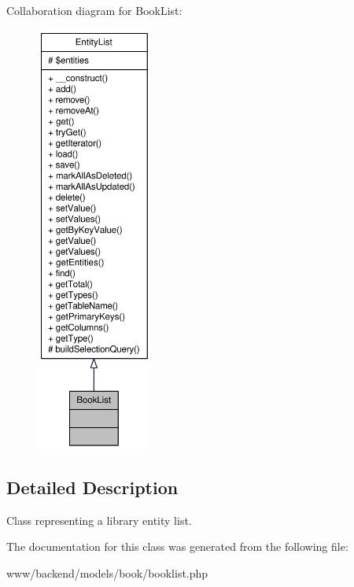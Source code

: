 Collaboration diagram for BookList:\nopagebreak
\begin{figure}[H]
\begin{center}
\leavevmode
\includegraphics[height=400pt]{classBookList__coll__graph}
\end{center}
\end{figure}


\subsection{Detailed Description}
Class representing a library entity list. 

The documentation for this class was generated from the following file:\begin{DoxyCompactItemize}
\item 
www/backend/models/book/booklist.php\end{DoxyCompactItemize}
